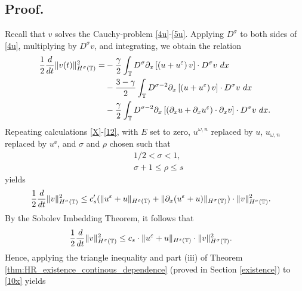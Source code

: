 \subsection{ Proof.}
Recall that $v$ solves the Cauchy-problem \eqref{4u}-\eqref{5u}.
Applying $D^\sigma$ to both sides of \eqref{4u}, multiplying by
$D^\sigma v$, and integrating, we obtain the
relation
\begin{equation*}
	\begin{split}
		\frac{1}{2}\frac{d}{dt}\|v(t)\|_{H^\sigma(\mathbb{T})}^2
		= & - \frac{\gamma}{2}\int_{\mathbb{T}} D^\sigma
		\partial_x \left[ \left( u + u^\varepsilon \right)v
		\right]\cdot D^\sigma v \ dx
		\\
		& - \frac{3-\gamma}{2}\int_{\mathbb{T}} D^{\sigma
		-2} \partial_x \left[ \left( u + u^\varepsilon
		\right)v \right] \cdot D^\sigma v \ dx
		\\
		& - \frac{\gamma}{2}\int_{\mathbb{T}} D^{\sigma
		-2}
		\partial_x \left[ \left( \partial_x u + \partial_x u^\varepsilon
		\right)\cdot \partial_x v \right] \cdot
		D^\sigma v \ dx.
	\end{split}
\end{equation*}
Repeating calculations \eqref{X}-\eqref{12}, with $E$ set to zero,
$u^{\omega,n}$ replaced by $u$, $u_{\omega,n}$ replaced by $u^\ee$, and
$\sigma$ and $\rho$ chosen such that
%
\begin{equation}
	\label{size_of_sigma}
	\begin{split}
	& 1/2 < \sigma < 1,
	\\
	& \sigma + 1 \le \rho \le s 
	\end{split}
\end{equation}
yields
 \begin{equation*}
	\begin{split}
		\frac{1}{2}\frac{d}{dt} \|v\|_{H^\sigma(\mathbb{T})}^2
		& \le
		c_s' (\|u^{\varepsilon} + u\|_{H^{\rho}(\mathbb{T})} +
		\|\partial_x(u^{\varepsilon} + u) \|_{H^\sigma(\mathbb{T})})
		\cdot \|v\|_{H^\sigma(\mathbb{T})}^2.
	\end{split}
\end{equation*}
\medskip
By the Sobolev Imbedding Theorem, it follows that 
\begin{equation}
	\begin{split}
		\frac{1}{2}\frac{d}{dt} \|v\|_{H^{\sigma}(\mathbb{T})}^2
		& \le
		c_s \cdot \|u^{\varepsilon}
		+ u\|_{H^{s}(\mathbb{T})}\cdot \|v\|_{H^{\sigma}(\mathbb{T})}^2.
		\label{10x}
	\end{split}
\end{equation}
Hence, applying the triangle inequality and
part (iii) of Theorem \ref{thm:HR_existence_continous_dependence} (proved
in Section \ref{existence}) to \eqref{10x} yields
